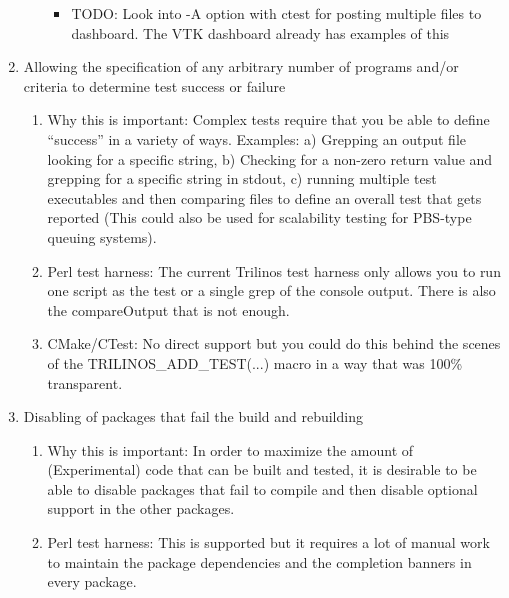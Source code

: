 \documentclass[pdf,ps2pdf,11pt]{SANDreport}
\begin{document}
\begin{enumerate}
\begin{enumerate}
    \begin{itemize}

    {}\item TODO: Look into -A option with ctest for posting multiple
    files to dashboard.  The VTK dashboard already has examples of
    this

    \end{itemize}

  \end{enumerate}

{}\item Allowing the specification of any arbitrary number of
programs and/or criteria to determine test success or failure

  \begin{enumerate}

  {}\item Why this is important: Complex tests require that you be
  able to define ``success'' in a variety of ways.  Examples: a)
  Grepping an output file looking for a specific string, b) Checking
  for a non-zero return value and grepping for a specific string in
  stdout, c) running multiple test executables and then comparing
  files to define an overall test that gets reported (This could also
  be used for scalability testing for PBS-type queuing systems).

  {}\item Perl test harness: The current Trilinos test harness only
  allows you to run one script as the test or a single grep of the
  console output.  There is also the compareOutput that is not
  enough.

  {}\item CMake/CTest: No direct support but you could do this behind
  the scenes of the TRILINOS\_ADD\_TEST(...) macro in a way that was
  100\% transparent.

  \end{enumerate}

{}\item Disabling of packages that fail the build and rebuilding

  \begin{enumerate}

  {}\item Why this is important: In order to maximize the amount of
  (Experimental) code that can be built and tested, it is desirable
  to be able to disable packages that fail to compile and then
  disable optional support in the other packages.

  {}\item Perl test harness: This is supported but it requires a lot
  of manual work to maintain the package dependencies and the
  completion banners in every package.


\end{enumerate}
\end{enumerate}
\end{document}
